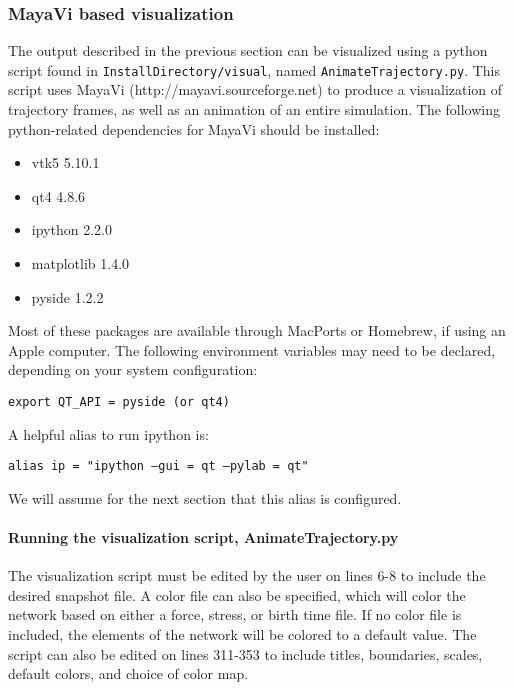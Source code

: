 \documentclass[11pt, oneside]{article}   	%
\begin{document}
\subsubsection{MayaVi based visualization}
The output described in the previous section can be visualized using a python script found in \texttt{InstallDirectory/visual}, named \texttt{AnimateTrajectory.py}. This script uses MayaVi (http://mayavi.sourceforge.net) to produce a visualization of trajectory frames, as well as an animation of an entire simulation.
The following python-related dependencies for MayaVi should be installed:
\begin{itemize}
\item vtk5 5.10.1
\item qt4 4.8.6
\item ipython 2.2.0
\item matplotlib 1.4.0
\item pyside 1.2.2
\end{itemize}

\noindent Most of these packages are available through MacPorts or Homebrew, if using an Apple computer. The following environment variables
may need to be declared, depending on your system configuration:\newline

\texttt{export QT\_API = pyside (or qt4)}\newline

\noindent A helpful alias to run ipython is:\newline

\texttt{alias ip = "ipython --gui = qt --pylab = qt"}\newline

\noindent We will assume for the next section that this alias is configured.

\paragraph{Running the visualization script, AnimateTrajectory.py}

The visualization script must be edited by the user on lines 6-8 to include the desired snapshot file. A color file can also be specified, which will color the network based on either a force, stress, or birth time file. If no color file is included, the elements of the network will be colored to a default value. The script can also be edited on lines 311-353 to include titles, boundaries, scales, default colors, and choice of color map. \newline
\end{document}
